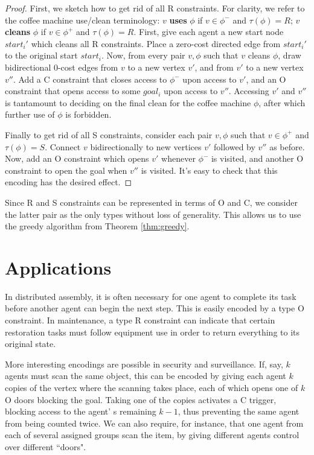 \documentclass[letterpaper]{article}
\begin{document}
\begin{proof}
First, we sketch how to get rid of all R constraints. For clarity, we refer to the coffee machine use/clean terminology: $v$ \textbf{uses} $\phi$ if $v\in\phi^-$ and $\tau(\phi) = R$; $v$ \textbf{cleans} $\phi$ if $v\in\phi^+$ and $\tau(\phi) = R$. First, give each agent a new start node $start_i'$ which cleans all R constraints. Place a zero-cost directed edge from $start_i'$ to the original start $start_i$. Now, from every pair $v,\phi$ such that $v$ cleans $\phi$, draw bidirectional 0-cost edges from $v$ to a new vertex $v'$, and from $v'$ to a new vertex $v''$. Add a C constraint that closes access to $\phi^-$ upon access to $v'$, and an O constraint that opens access to some $goal_i$ upon access to $v''$. Accessing $v'$ and $v''$ is tantamount to deciding on the final clean for the coffee machine $\phi$, after which further use of $\phi$ is forbidden.

Finally to get rid of all S constraints, consider each pair $v,\phi$ such that $v\in\phi^+$ and $\tau(\phi) = S$. Connect $v$ bidirectionally to new vertices $v'$ followed by $v''$ as before. Now, add an O constraint which opens $v'$ whenever $\phi^-$ is visited, and another O constraint to open the goal when $v''$ is visited. It's easy to check that this encoding has the desired effect.
\end{proof}

Since R and S constraints can be represented in terms of O and C, we consider the latter pair as the only types without loss of generality. This allows us to use the greedy algorithm from Theorem \ref{thm:greedy}.

\section{Applications}

In distributed assembly, it is often necessary for one agent to complete its task before another agent can begin the next step. This is easily encoded by a type O constraint. In maintenance, a type R constraint can indicate that certain restoration tasks must follow equipment use in order to return everything to its original state.

More interesting encodings are possible in security and surveillance. If, say, $k$ agents must scan the same object, this can be encoded by giving each agent $k$ copies of the vertex where the scanning takes place, each of which opens one of $k$ O doors blocking the goal. Taking one of the copies activates a C trigger, blocking access to the agent' s remaining $k-1$, thus preventing the same agent from being counted twice. We can also require, for instance, that one agent from each of several assigned groups scan the item, by giving different agents control over different ``doors".
\end{document}
